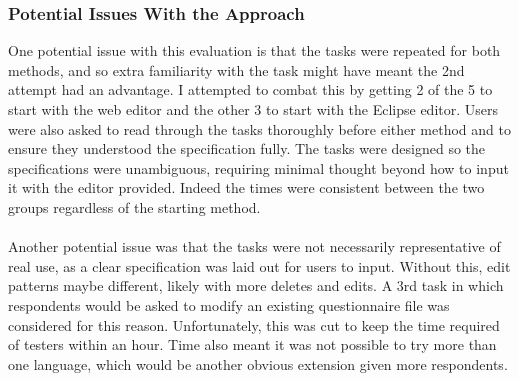 \documentclass{article}
\begin{document}
{%

% 




\subsubsection{Potential Issues With the Approach}
One potential issue with this evaluation is that the tasks were repeated for both methods, and so extra familiarity with the task might have meant the 2nd attempt had an advantage. I attempted to combat this by getting 2 of the 5 to start with the web editor and the other 3 to start with the Eclipse editor. Users were also asked to read through the tasks thoroughly before either method and to ensure they understood the specification fully. The tasks were designed so the specifications were unambiguous, requiring minimal thought beyond how to input it with the editor provided. Indeed the times were consistent between the two groups regardless of the starting method.
\\
\\
Another potential issue was that the tasks were not necessarily representative of real use, as a clear specification was laid out for users to input. Without this, edit patterns maybe different, likely with more deletes and edits. A 3rd task in which respondents would be asked to modify an existing questionnaire file was considered for this reason. Unfortunately, this was cut to keep the time required of testers within an hour. Time also meant it was not possible to try more than one language, which would be another obvious extension given more respondents.
}
\end{document}
